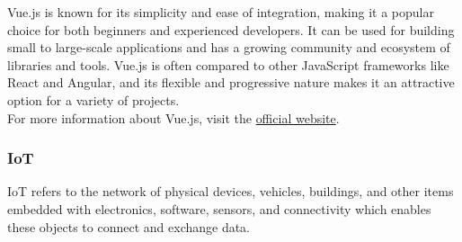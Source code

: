 Vue.js is known for its simplicity and ease of integration, making it a popular choice for both beginners and experienced developers. It can be used for building small to large-scale applications and has a growing community and ecosystem of libraries and tools. Vue.js is often compared to other JavaScript frameworks like React and Angular, and its flexible and progressive nature makes it an attractive option for a variety of projects.\vspace{5mm} \\
For more information about Vue.js, visit the \href{https://vuejs.org/}{official website}.
\subsubsection{IoT}
\ac{IoT} refers to the network of physical devices, vehicles, buildings, and other items embedded with electronics, software, sensors, and connectivity which enables these objects to connect and exchange data.
